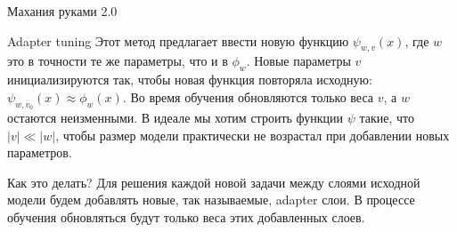 \documentclass[9pt]{beamer}
\begin{document}
\begin{frame}{Махания руками 2.0}
    
    \begin{block}{Adapter tuning}
        Этот метод предлагает ввести новую функцию $\psi_{w, v}(x)$, где $w$ это в точности те же параметры, что и в $\phi_w$. Новые параметры $v$ инициализируются так, чтобы новая функция повторяла исходную: $\psi_{w, v_0}(x) \approx \phi_w(x)$. Во время обучения обновляются только веса $v$, а $w$ остаются неизменными. В идеале мы хотим строить функции $\psi$ такие, что $|v| \ll |w|$, чтобы размер модели практически не возрастал при добавлении новых параметров.
    \end{block}

    \begin{block}{Как это делать?}
        Для решения каждой новой задачи между слоями исходной модели будем добавлять новые, так называемые, adapter слои. В процессе обучения обновляться будут только веса этих добавленных слоев.
    \end{block}

\end{frame}
\end{document}
